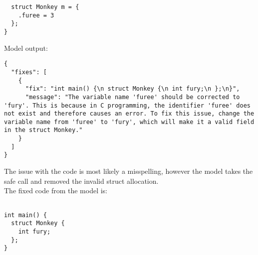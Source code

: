 \documentclass{article}
\begin{document}
\begin{enumerate}
\begin{verbatim}
  struct Monkey m = {
    .furee = 3
  };
}
			\end{verbatim}
			Model output:
			\begin{verbatim}
{
  "fixes": [
    {
      "fix": "int main() {\n struct Monkey {\n int fury;\n };\n}",
      "message": "The variable name 'furee' should be corrected to 'fury'. This is because in C programming, the identifier 'furee' does not exist and therefore causes an error. To fix this issue, change the variable name from 'furee' to 'fury', which will make it a valid field in the struct Monkey."
    }
  ]
}		\end{verbatim}
			The issue with the code is most likely a misspelling, however the model takes the safe call and removed the invalid struct allocation. \\
			The fixed code from the model is:
			\begin{verbatim}

int main() {
  struct Monkey {
    int fury;
  };
}
			\end{verbatim}
		\end{enumerate}
\end{document}
